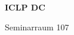 \documentclass[a4paper]{article}
\begin{document}
\printGenericVSLHeader
\begin{center}
\begin{vsltext}{2.5cm}{4cm}

   \vspace{0.5cm} 

    \textbf{ICLP DC} 

    \vspace{1.5cm}

    Seminarraum 107 

\end{vsltext}

\end{center}
\end{document}
